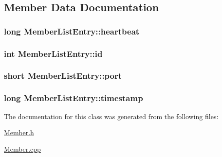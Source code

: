 \subsection{\-Member \-Data \-Documentation}
\hypertarget{class_member_list_entry_ae01ac985a9a529b0046bc463e97b9a52}{
\subsubsection[{heartbeat}]{\setlength{\rightskip}{0pt plus 5cm}long {\bf \-Member\-List\-Entry\-::heartbeat}}}\label{db/dac/class_member_list_entry_ae01ac985a9a529b0046bc463e97b9a52}
\hypertarget{class_member_list_entry_a569594f798c011bec978d7de9af9e87c}{
\subsubsection[{id}]{\setlength{\rightskip}{0pt plus 5cm}int {\bf \-Member\-List\-Entry\-::id}}}\label{db/dac/class_member_list_entry_a569594f798c011bec978d7de9af9e87c}
\hypertarget{class_member_list_entry_ae85ba26966dc188c7fec4c298fb47a81}{
\subsubsection[{port}]{\setlength{\rightskip}{0pt plus 5cm}short {\bf \-Member\-List\-Entry\-::port}}}\label{db/dac/class_member_list_entry_ae85ba26966dc188c7fec4c298fb47a81}
\hypertarget{class_member_list_entry_ae15f1e7b93b9f19be264930c783615cc}{
\subsubsection[{timestamp}]{\setlength{\rightskip}{0pt plus 5cm}long {\bf \-Member\-List\-Entry\-::timestamp}}}\label{db/dac/class_member_list_entry_ae15f1e7b93b9f19be264930c783615cc}


\-The documentation for this class was generated from the following files\-:\begin{DoxyCompactItemize}
\item 
\hyperlink{_member_8h}{\-Member.\-h}\item 
\hyperlink{_member_8cpp}{\-Member.\-cpp}\end{DoxyCompactItemize}
